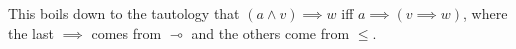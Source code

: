 This boils down to the tautology that $(a \land v) \implies w$ iff $a \implies (v \implies w)$, where the last $\implies$ comes from $\multimap$ and the others come from $\leq$.
